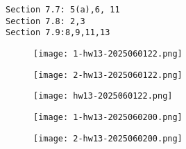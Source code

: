 \begin{lstlisting}
Section 7.7: 5(a),6, 11
Section 7.8: 2,3
Section 7.9:8,9,11,13
\end{lstlisting}
\begin{exercise}
\begin{figure}[H]
\centering
\texttt{[image: 1-hw13-2025060122.png]}
\label{}
\end{figure}
\begin{figure}[H]
\centering
\texttt{[image: 2-hw13-2025060122.png]}
\label{}
\end{figure}
\begin{figure}[H]
\centering
\texttt{[image: hw13-2025060122.png]}
\label{}
\end{figure}
\end{exercise}
\begin{figure}[H]
\centering
\texttt{[image: 1-hw13-2025060200.png]}
\label{}
\end{figure}
\begin{figure}[H]
\centering
\texttt{[image: 2-hw13-2025060200.png]}
\label{}
\end{figure}

